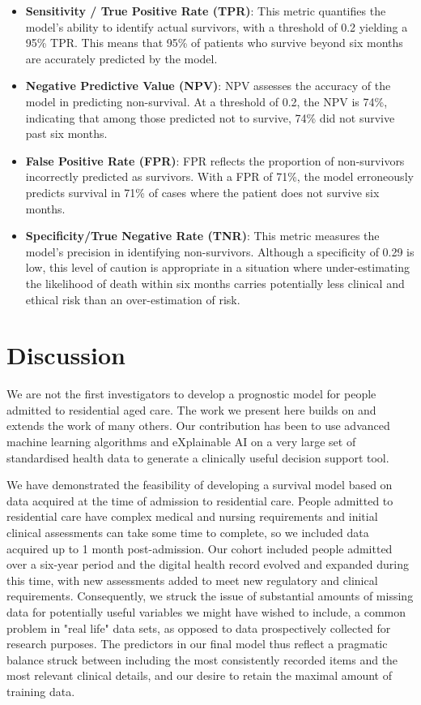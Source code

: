 \documentclass{article}
\begin{document}
\begin{itemize}
  \item \textbf{Sensitivity / True Positive Rate (TPR)}: This metric quantifies the model's ability to identify actual survivors, with a threshold of 0.2 yielding a 95\% TPR. This means that 95\% of patients who survive beyond six months are accurately predicted by the model.
  \item \textbf{Negative Predictive Value (NPV)}: NPV assesses the accuracy of the model in predicting non-survival. At a threshold of 0.2, the NPV is 74\%, indicating that among those predicted not to survive, 74\% did not survive past six months.
  \item \textbf{False Positive Rate (FPR)}: FPR reflects the proportion of non-survivors incorrectly predicted as survivors. With a FPR of 71\%, the model erroneously predicts survival in 71\% of cases where the patient does not survive six months.
  \item \textbf{Specificity/True Negative Rate (TNR)}: This metric measures the model's precision in identifying non-survivors.  Although a specificity of 0.29 is low, this level of caution is appropriate in a situation where under-estimating the likelihood of death within six months carries potentially less clinical and ethical risk than an over-estimation of risk.
\end{itemize}



\section{Discussion}
We are not the first investigators to develop a prognostic model for people admitted to residential aged care. The work we present here builds on and extends the work of many others\cite{ogarek2018minimum, porock2010mds, flacker2003mortality, mitchell2010prediction, mitchell2004estimating, niznik2018adaptation, bicknell2020study}.  Our contribution has been to use advanced machine learning algorithms and eXplainable AI on a very large set of standardised health data to generate a clinically useful decision support tool.

We have demonstrated the feasibility of developing a survival model based on data acquired at the time of admission to residential care. People admitted to residential care have complex medical and nursing requirements and initial clinical assessments can take some time to complete, so we included data acquired up to 1 month post-admission. Our cohort included people admitted over a six-year period and the digital health record evolved and expanded during this time, with new assessments added to meet new regulatory and clinical requirements.
 Consequently, we struck the issue of substantial amounts of missing data for potentially useful variables we might have wished to include, a common problem in "real life" data sets, as opposed to data prospectively collected for research purposes. The predictors in our final model thus reflect a pragmatic balance struck between including the most consistently recorded items and the most relevant clinical details, and our desire to retain the maximal amount of training data.
\end{document}
